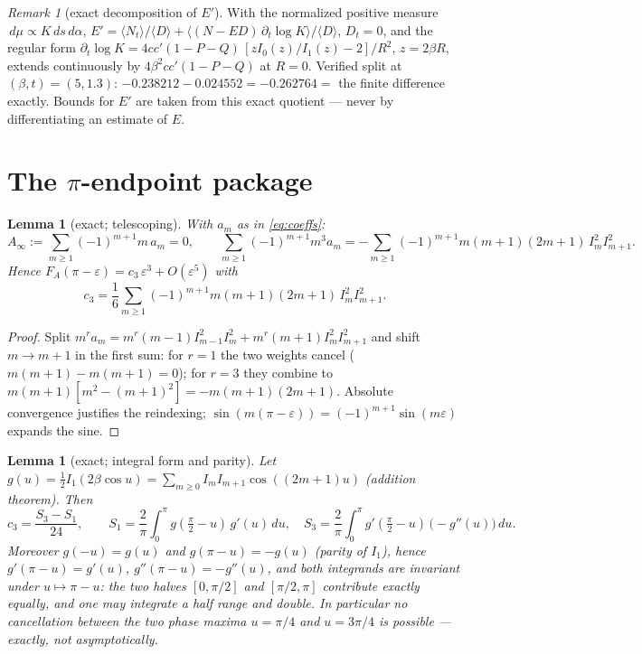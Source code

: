 \documentclass[11pt]{article}
\newtheorem{lemma}[theorem]{Lemma}
\theoremstyle{remark}
\newtheorem{remark}[theorem]{Remark}
\newcommand{\FA}{F_{\!A}}
\newcommand{\dd}{\,d}
\begin{document}
\begin{remark}[exact decomposition of $E'$]\label{rem:Eprime}
With the normalized positive measure $\dd\mu\propto K\dd s\dd\alpha$,
$E'=\langle N_t\rangle/\langle D\rangle+\langle(N-ED)\,
\partial_t\log K\rangle/\langle D\rangle$, $D_t=0$, and the regular form
$\partial_t\log K=4cc'(1-P-Q)\,[zI_0(z)/I_1(z)-2]/R^2$, $z=2\beta R$,
extends continuously by $4\beta^2cc'(1-P-Q)$ at $R=0$. Verified split at
$(\beta,t)=(5,1.3)$: $-0.238212-0.024552=-0.262764=$ the finite
difference exactly. Bounds for $E'$ are taken from this exact quotient
--- never by differentiating an estimate of $E$.
\end{remark}

\section{The $\pi$-endpoint package}\label{sec:endpoint}

\begin{lemma}[exact; telescoping]\label{lem:telescope}
With $a_m$ as in \eqref{eq:coeffs}:
\[
A_\infty:=\sum_{m\ge1}(-1)^{m+1}m\,a_m=0,
\qquad
\sum_{m\ge1}(-1)^{m+1}m^3a_m
=-\sum_{m\ge1}(-1)^{m+1}m(m+1)(2m+1)\,I_m^2I_{m+1}^2 .
\]
Hence $\FA(\pi-\varepsilon)=c_3\,\varepsilon^3+O(\varepsilon^5)$ with
\begin{equation}\label{eq:c3}
c_3=\frac16\sum_{m\ge1}(-1)^{m+1}m(m+1)(2m+1)\,I_m^2I_{m+1}^2 .
\end{equation}
\end{lemma}

\begin{proof}
Split $m^ra_m=m^r(m-1)I_{m-1}^2I_m^2+m^r(m+1)I_m^2I_{m+1}^2$ and shift
$m\to m+1$ in the first sum: for $r=1$ the two weights cancel
($m(m+1)-m(m+1)=0$); for $r=3$ they combine to
$m(m+1)[m^2-(m+1)^2]=-m(m+1)(2m+1)$. Absolute convergence justifies the
reindexing; $\sin(m(\pi-\varepsilon))=(-1)^{m+1}\sin(m\varepsilon)$
expands the sine.
\end{proof}

\begin{lemma}[exact; integral form and parity]\label{lem:c3int}
Let $g(u)=\tfrac12 I_1(2\beta\cos u)=\sum_{m\ge0}I_mI_{m+1}
\cos((2m+1)u)$ \textup{(addition theorem)}. Then
\[
c_3=\frac{S_3-S_1}{24},\qquad
S_1=\frac{2}{\pi}\int_0^{\pi}g(\tfrac\pi2-u)\,g'(u)\dd u,\quad
S_3=\frac{2}{\pi}\int_0^{\pi}g'(\tfrac\pi2-u)\,\bigl(-g''(u)\bigr)\dd u .
\]
Moreover $g(-u)=g(u)$ and $g(\pi-u)=-g(u)$ (parity of $I_1$), hence
$g'(\pi-u)=g'(u)$, $g''(\pi-u)=-g''(u)$, and \emph{both} integrands are
invariant under $u\mapsto\pi-u$: the two halves $[0,\pi/2]$ and
$[\pi/2,\pi]$ contribute exactly equally, and one may integrate a half
range and double. In particular no cancellation between the two phase
maxima $u=\pi/4$ and $u=3\pi/4$ is possible --- exactly, not
asymptotically.
\end{lemma}
\end{document}

